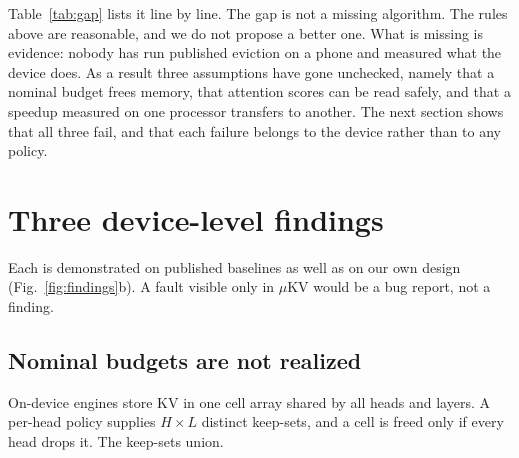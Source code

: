 \documentclass[11pt]{article}
\begin{document}
\noindent Table~\ref{tab:gap} lists it line by line. The gap is not a missing algorithm. The rules above are reasonable, and we do not
propose a better one. What is missing is evidence: nobody has run published eviction on a
phone and measured what the device does. As a result three assumptions have gone unchecked,
namely that a nominal budget frees memory, that attention scores can be read safely, and that
a speedup measured on one processor transfers to another. The next section shows that all
three fail, and that each failure belongs to the device rather than to any policy.

\section{Three device-level findings}
Each is demonstrated on published baselines as well as on our own design (Fig.~\ref{fig:findings}b). A fault visible
only in $\mu$KV would be a bug report, not a finding.

\subsection{Nominal budgets are not realized}
On-device engines store KV in one cell array shared by all heads and layers. A per-head
policy supplies $H{\times}L$ distinct keep-sets, and a cell is freed only if every head drops
it. The keep-sets union.
\end{document}
